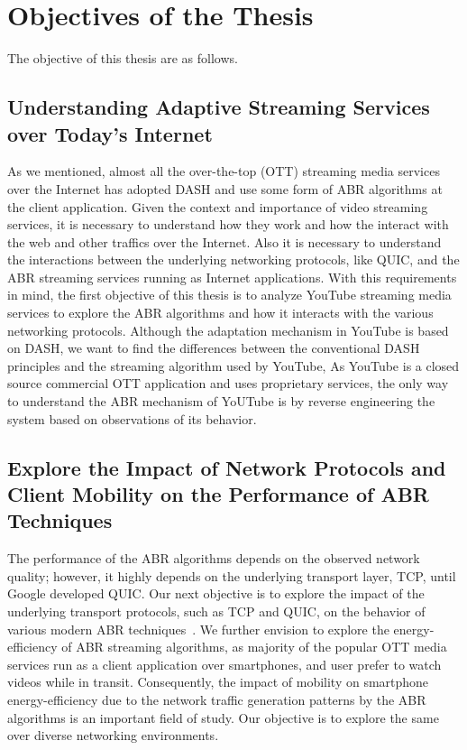 \section{Objectives of the Thesis}
The objective of this thesis are as follows. 

\subsection{Understanding Adaptive Streaming Services over Today's Internet}
As we mentioned, almost all the over-the-top (OTT) streaming media services over the Internet has adopted DASH and use some form of ABR algorithms at the client application. Given the context and importance of video streaming services, it is necessary to understand how they work and how the interact with the web and other traffics over the Internet. Also it is necessary to understand the interactions between the underlying networking protocols, like QUIC, and the ABR streaming services running as Internet applications. With this requirements in mind, the first objective of this thesis is to analyze YouTube streaming media services to explore the ABR algorithms and how it interacts with the various networking protocols. Although the adaptation mechanism in YouTube is based on DASH, we want to find the differences between the conventional DASH principles and the streaming algorithm used by YouTube, As YouTube is a closed source commercial OTT application and uses proprietary services, the only way to understand the ABR mechanism of YoUTube is by reverse engineering the system based on observations of its behavior. 

\subsection{Explore the Impact of Network Protocols and Client Mobility on the Performance of ABR Techniques}
The performance of the ABR algorithms depends on the observed network quality; however, it highly depends on the underlying transport layer, TCP, until Google developed QUIC. Our next objective is to explore the impact of the underlying transport protocols, such as TCP and QUIC, on the behavior of various modern ABR techniques~\cite{Spiteri2016,Mao2017}. We further envision to explore the energy-efficiency of ABR streaming algorithms, as majority of the popular OTT media services run as a client application over smartphones, and user prefer to watch videos while in transit. Consequently, the impact of mobility on smartphone energy-efficiency due to the network traffic generation patterns by the ABR algorithms is an important field of study. Our objective is to explore the same over diverse networking environments.  


